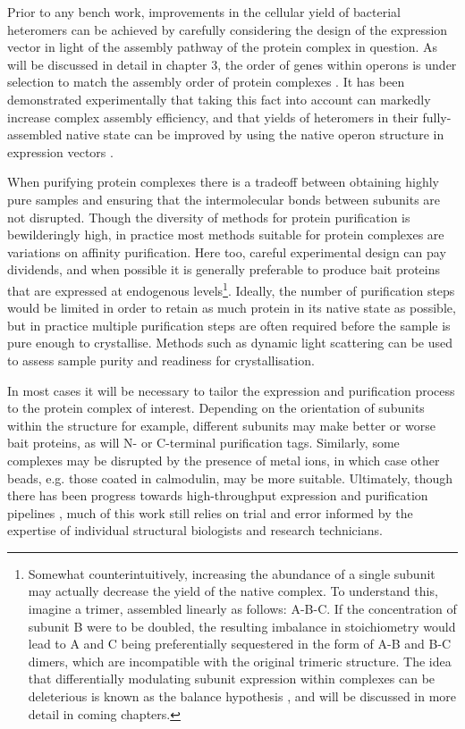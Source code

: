 \documentclass[a4paper,11pt,twoside,openright]{scrbook}
\begin{document}
Prior to any bench work, improvements in the cellular yield of bacterial
heteromers can be achieved by carefully considering the design of the expression
vector in light of the assembly pathway of the protein complex in question. As
will be discussed in detail in chapter 3, the order of genes within operons is
under selection to match the assembly order of protein complexes
\cite{Wells2016}. It has been demonstrated experimentally that taking this fact
into account can markedly increase complex assembly efficiency, and that yields
of heteromers in their fully-assembled native state can be improved by using the
native operon structure in expression vectors \cite{Shieh2015a, Poulsen2010}.

When purifying protein complexes there is a tradeoff between obtaining highly
pure samples and ensuring that the intermolecular bonds between subunits are not
disrupted. Though the diversity of methods for protein purification is
bewilderingly high, in practice most methods suitable for protein complexes are
variations on affinity purification. Here too, careful experimental design can
pay dividends, and when possible it is generally preferable to produce bait
proteins that are expressed at endogenous levels\footnote{Somewhat
counterintuitively, increasing the abundance of a single subunit may actually
decrease the yield of the native complex. To understand this, imagine a trimer,
assembled linearly as follows: A-B-C. If the concentration of subunit B were to
be doubled, the resulting imbalance in stoichiometry would lead to A and C being
preferentially sequestered in the form of A-B and B-C dimers, which are
incompatible with the original trimeric structure. The idea that differentially
modulating subunit expression within complexes can be deleterious is known as
the balance hypothesis \cite{Papp2003}, and will be discussed in more detail in
coming chapters.}. Ideally, the number of purification steps would be limited in
order to retain as much protein in its native state as possible, but in practice
multiple purification steps are often required before the sample is pure enough
to crystallise. Methods such as dynamic light scattering \cite{Ni2013} can be
used to assess sample purity and readiness for crystallisation.

In most cases it will be necessary to tailor the expression and purification
process to the protein complex of interest. Depending on the orientation of
subunits within the structure for example, different subunits may make better or
worse bait proteins, as will N- or C-terminal purification tags. Similarly, some
complexes may be disrupted by the presence of metal ions, in which case other
beads, e.g. those coated in calmodulin, may be more suitable. Ultimately, though
there has been progress towards high-throughput expression and purification
pipelines \cite{Jia2016}, much of this work still relies on trial and error
informed by the expertise of individual structural biologists and research
technicians.
\end{document}
